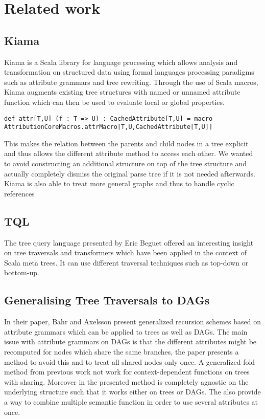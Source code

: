 \section{Related work}
\subsection{Kiama}
Kiama is a Scala library for language processing which allows analysis and transformation on structured data using formal languages processing paradigms such as attribute grammars and tree rewriting.
Through the use of Scala macros, Kiama augments existing tree structures with named or unnamed attribute function which can then be used to evaluate local or global properties.\\
\begin{verbatim}def attr[T,U] (f : T => U) : CachedAttribute[T,U] = macro AttributionCoreMacros.attrMacro[T,U,CachedAttribute[T,U]]\end{verbatim}
This makes the relation between the parents and child nodes in a tree explicit and thus allows the different attribute method to access each other. We wanted to avoid constructing an additional structure on top of the tree structure and actually completely dismiss the original parse tree if it is not needed afterwards.
Kiama is also able to treat more general graphs and thus to handle cyclic references


\subsection{TQL\cite{tql}}
The tree query language presented by Eric Beguet offered an interesting insight on tree traversals and transformers which have been applied in the context of Scala meta trees. It can use different traversal techniques such as top-down or bottom-up.

\subsection{Generalising Tree Traversals to DAGs}
In their paper, Bahr and Axelsson present generalized recursion schemes based on attribute grammars which can be applied to trees as well as DAGs. The main issue with attribute grammars on DAGs is that the different attributes might be recomputed for nodes which share the same branches, the paper presents a method to avoid this and to treat all shared nodes only once. A generalized fold method from previous work not work for context-dependent functions on trees with sharing. Moreover in the presented method is completely agnostic on the underlying structure such that it works either on trees or DAGs.
The also provide a way to combine multiple semantic function in order to use several attributes at once.

